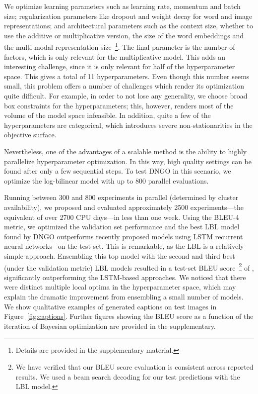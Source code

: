 \documentclass{article}
\begin{document}
We optimize learning parameters such as learning rate, momentum and batch size; regularization parameters like dropout and weight decay for word and image representations; and architectural parameters such as the context size, whether to use the additive or multiplicative version, the size of the word embeddings and the multi-modal representation size~\footnote{Details are provided in the supplementary material.}. The final parameter is the number of factors, which is only relevant for the multiplicative model. This adds an interesting challenge, since it is only relevant for half of the hyperparameter space. This gives a total of 11 hyperparameters. Even though this number seems small, this problem offers a number of challenges which render its optimization quite difficult. For example, in order to not lose any generality, we choose broad box constraints for the hyperparameters; this, however, renders most of the volume of the model space infeasible. In addition, quite a few of the hyperparameters are categorical, which introduces severe non-stationarities in the objective surface.

Nevertheless, one of the advantages of a scalable method is the ability to highly parallelize hyperparameter optimization. In this way, high quality settings can be found after only a few sequential steps. To test DNGO in this scenario, we optimize the log-bilinear model with up to 800 parallel evaluations.

Running between 300 and 800 experiments in parallel (determined by cluster availability), we proposed and evaluated approximately 2500 experiments---the equivalent of over 2700 CPU days---in less than one week. Using the BLEU-4 metric, we optimized the validation set performance and the best LBL model found by DNGO outperforms recently proposed models using LSTM recurrent neural networks~\cite{zaremba-etal-2015a,xu-etal-2015a} on the test set. This is remarkable, as the LBL is a relatively simple approach. Ensembling this top model with the second and third best (under the validation metric) LBL models resulted in a test-set BLEU score~\footnote{We have verified that our BLEU score evaluation is consistent across reported results. We used a beam search decoding for our test predictions with the LBL model.} of , significantly outperforming the LSTM-based approaches. We noticed that there were distinct multiple local optima in the hyperparameter space, which may explain the dramatic improvement from ensembling a small number of models.  We show qualitative examples of generated captions on test images in Figure~\ref{fig:captions}.  Further figures showing the BLEU score as a function of the iteration of Bayesian optimization are provided in the supplementary.
\end{document}
